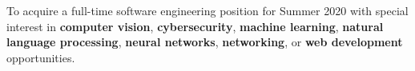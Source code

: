 

\begin{cvparagraph}

To acquire a full-time software engineering position for Summer 2020 with
special interest in \textbf{computer vision}, \textbf{cybersecurity},
\textbf{machine learning}, \textbf{natural language processing}, \textbf{neural
networks}, \textbf{networking}, or \textbf{web development} opportunities.

\end{cvparagraph}
